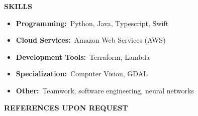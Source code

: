 \textbf{SKILLS}

\begin{itemize}
\item
  \textbf{Programming:}~Python, Java, Typescript, Swift
\item
  \textbf{Cloud Services:}~Amazon Web Services (AWS)
\item
  \textbf{Development Tools:}~Terraform, Lambda
\item
  \textbf{Specialization:}~Computer Vision, GDAL
\item
  \textbf{Other:}~Teamwork, software engineering, neural networks
\end{itemize}

\textbf{REFERENCES UPON REQUEST}
